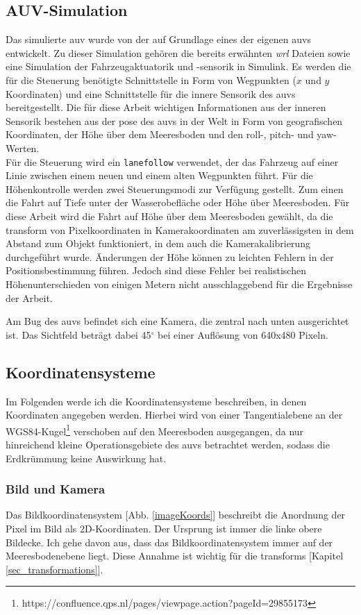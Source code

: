 \subsection{AUV-Simulation}
\label{sec_auvSimGrundlage}
Das simulierte \gls{auv} wurde von der \atlas auf Grundlage eines der eigenen \gls{auv}s entwickelt. Zu dieser Simulation gehören die bereits erwähnten \textit{wrl} Dateien sowie eine Simulation der Fahrzeugaktuatorik und -sensorik in \matlab Simulink. Es werden die für die Steuerung benötigte Schnittstelle in Form von Wegpunkten ($x$ und $y$ Koordinaten) und eine Schnittstelle für die innere Sensorik des \gls{auv}s bereitgestellt. Die für diese Arbeit wichtigen Informationen aus der inneren Sensorik bestehen aus der \gls{pose} des \gls{auv}s in der Welt in Form von geografischen Koordinaten, der Höhe über dem Meeresboden und den \gls{roll}-, \gls{pitch}- und \gls{yaw}-Werten.\\
Für die Steuerung wird ein \texttt{\gls{lanefollow}} verwendet, der das Fahrzeug auf einer Linie zwischen einem neuen und einem alten Wegpunkten führt. Für die Höhenkontrolle werden zwei Steuerungsmodi zur Verfügung gestellt. Zum einen die Fahrt auf Tiefe unter der Wasserobefläche oder Höhe über Meeresboden. Für diese Arbeit wird die Fahrt auf Höhe über dem Meeresboden gewählt, da die \gls{transform} von Pixelkoordinaten in Kamerakoordinaten am zuverlässigsten in dem Abstand zum Objekt funktioniert, in dem auch die Kamerakalibrierung durchgeführt wurde. Änderungen der Höhe können zu leichten Fehlern in der Positionsbestimmung führen. Jedoch sind diese Fehler bei realistischen Höhenunterschieden von einigen Metern nicht ausschlaggebend für die Ergebnisse der Arbeit.

Am Bug des \gls{auv}s befindet sich eine Kamera, die zentral nach unten ausgerichtet ist. Das Sichtfeld beträgt dabei 45$^\circ$ bei einer Auflösung von 640x480 Pixeln.
\subsection{Koordinatensysteme}
\label{sec_coordsystems}
Im Folgenden werde ich die Koordinatensysteme beschreiben, in denen Koordinaten angegeben werden. Hierbei wird von einer Tangentialebene an der WGS84-Kugel\footnote{https://confluence.qps.nl/pages/viewpage.action?pageId=29855173} verschoben auf den Meeresboden ausgegangen, da nur hinreichend kleine Operationsgebiete des \gls{auv}s betrachtet werden, sodass die Erdkrümmung keine Auswirkung hat.
\subsubsection{Bild und Kamera}
\label{sec_img_cam_coords}
Das Bildkoordinatensystem [Abb. \ref{imageKoords}] beschreibt die Anordnung der Pixel im Bild als 2D-Koordinaten. Der Ursprung ist immer die linke obere Bildecke. Ich gehe davon aus, dass das Bildkoordinatensystem immer auf der Meeresbodenebene liegt. Diese Annahme ist wichtig für die \glspl{transform} [Kapitel \ref{sec_transformations}].

